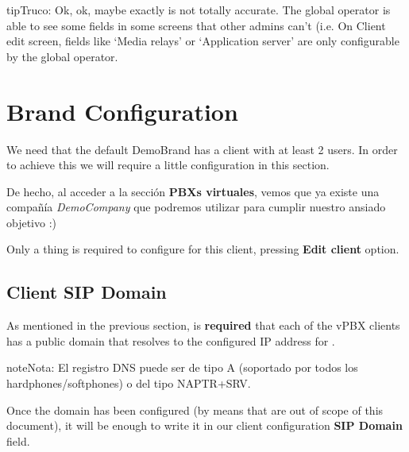 \documentclass[letterpaper,10pt,spanish]{sphinxmanual}
\begin{document}
\begin{notice}{tip}{Truco:}
Ok, ok, maybe exactly is not totally accurate. The global operator is
able to see some fields in some screens that other admins can't (i.e. On
Client edit screen, fields like `Media relays' or `Application server' are
only configurable by the global operator.
\end{notice}


\section{Brand Configuration}
\label{getting_started/internal_calls/brand_portal::doc}\label{getting_started/internal_calls/brand_portal:brand-configuration}\label{getting_started/internal_calls/brand_portal:id1}
We need that the default DemoBrand has a client with at least 2 users. In
order to achieve this we will require a little configuration in this section.

De hecho, al acceder a la sección \textbf{PBXs virtuales}, vemos que ya existe una compañía \emph{DemoCompany} que podremos utilizar para cumplir nuestro ansiado objetivo :)

Only a thing is required to configure for this client, pressing \textbf{Edit client} option.
\label{getting_started/internal_calls/brand_portal:domain-per-client}

\subsection{Client SIP Domain}
\label{getting_started/internal_calls/brand_portal:domain-per-client}\label{getting_started/internal_calls/brand_portal:id2}\label{getting_started/internal_calls/brand_portal:client-sip-domain}
As mentioned in the previous section, is \textbf{required} that each of the vPBX clients
has a public domain that resolves to the configured IP address for
{\hyperref[administration_portal/platform/infrastructure/proxy_users:proxyusers]{}}.

\begin{notice}{note}{Nota:}
El registro DNS puede ser de tipo A (soportado por todos los hardphones/softphones) o del tipo NAPTR+SRV.
\end{notice}

Once the domain has been configured (by means that are out of scope of this
document), it will be enough to write it in our client configuration \textbf{SIP Domain} field.
\end{document}
